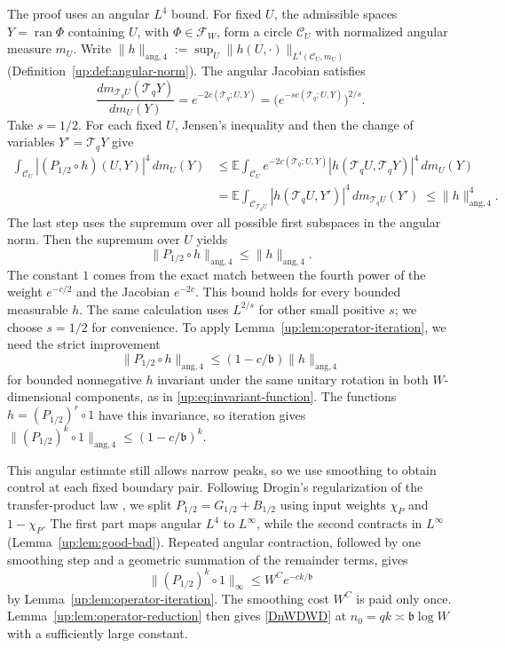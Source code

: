 \documentclass[11pt]{article}
\numberwithin{equation}{section}
\theoremstyle{remark}
\newcommand{\E}{\mathbb E}
\newcommand{\ran}{\operatorname{ran}}
\begin{document}
The proof uses an angular $L^4$ bound. For fixed $U$, the admissible
spaces $Y=\ran\Phi$ containing $U$, with $\Phi\in\mathcal F_W$, form a
circle $\mathcal C_U$ with normalized angular measure $m_U$. Write
$\|h\|_{\mathrm{ang},4}:=\sup_U\|h(U,\cdot)\|_{L^4(\mathcal C_U,m_U)}$
(Definition~\ref{up:def:angular-norm}).
The angular Jacobian satisfies
\[
 \frac{dm_{\mathcal T_qU}(\mathcal T_qY)}{dm_U(Y)}
 =e^{-2c(\mathcal T_q;U,Y)}=\bigl(e^{-s c(\mathcal T_q;U,Y)}\bigr)^{2/s}.
\]
 Take $s=1/2$.
For each fixed $U$, Jensen's inequality and then the change of variables
$Y'=\mathcal T_qY$ give
\begin{equation}\label{intro:eq:angular-nonexpansion}
 \begin{aligned}
 \int_{\mathcal C_U}|(P_{1/2}\circ h)(U,Y)|^4\,dm_U(Y)
 &\le\E\int_{\mathcal C_U}e^{-2c(\mathcal T_q;U,Y)}
       |h(\mathcal T_qU,\mathcal T_qY)|^4\,dm_U(Y)\\
 &=\E\int_{\mathcal C_{\mathcal T_qU}}
       |h(\mathcal T_qU,Y')|^4\,dm_{\mathcal T_qU}(Y')\;\le\|h\|_{\mathrm{ang},4}^4.
 \end{aligned}
\end{equation}
The last step uses the supremum over all possible first subspaces
in the angular norm. Then the supremum over $U$ yields
\[
 \|P_{1/2}\circ h\|_{\mathrm{ang},4}\le\|h\|_{\mathrm{ang},4}.
\]
The constant $1$ comes from the exact match between the fourth power
of the weight $e^{-c/2}$ and the Jacobian $e^{-2c}$.
This bound holds for every bounded measurable $h$.
The same calculation uses $L^{2/s}$ for other small positive $s$;
we choose $s=1/2$ for convenience. To apply
Lemma~\ref{up:lem:operator-iteration}, we need the strict improvement
\[
 \|P_{1/2}\circ h\|_{\mathrm{ang},4}
 \le(1-c/\mathfrak b)\|h\|_{\mathrm{ang},4}
\]
for bounded nonnegative $h$ invariant under the same unitary rotation
in both $W$-dimensional components, as in \eqref{up:eq:invariant-function}.
The functions $h=(P_{1/2})^r\circ1$ have this invariance, so iteration
gives $\|(P_{1/2})^k\circ1\|_{\mathrm{ang},4}\le(1-c/\mathfrak b)^k$.

This angular estimate still allows narrow peaks, so we use smoothing
to obtain control at each fixed boundary pair. Following Drogin's
regularization of the transfer-product law \cite[Section~4]{Drogin},
we split $P_{1/2}=G_{1/2}+B_{1/2}$ using input weights $\chi_P$ and
$1-\chi_P$. The first part maps angular $L^4$ to $L^\infty$, while the
second contracts in $L^\infty$ (Lemma~\ref{up:lem:good-bad}).
Repeated angular contraction, followed by one smoothing step and a
geometric summation of the remainder terms, gives
\[
 \|(P_{1/2})^k\circ1\|_\infty\le W^C e^{-ck/\mathfrak b}
\]
by Lemma~\ref{up:lem:operator-iteration}. The smoothing cost $W^C$
is paid only once. Lemma~\ref{up:lem:operator-reduction} then gives
\eqref{DnWDWD} at $n_0=qk\asymp\mathfrak b\log W$ with a sufficiently
large constant.
\end{document}
